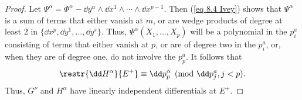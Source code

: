 \begin{proof}
    Let $\Psi^\alpha=\Phi^\alpha-\dd y^\alpha\wedge\dd x^1\wedge\cdots\wedge\dd x^{p-1}$. Then (\ref{eq 8.4 Ivey}) shows that $\Psi^\alpha$ is a sum of terms that either vanish at $m$, or are wedge products of degree at least $2$ in $\{\dd x^p,\dd y^1,\ldots,\dd y^s\}$. Thus, $\Psi^\alpha(X_1,\ldots,X_p)$ will be a polynomial in the $p^a_i$ consisting of terms that either vanish at $p$, or are of degree two in the $p^a_i$, or, when they are of degree one, do not involve the $p^a_p$. It follows that 
    \[\restr{\dd H^\alpha}{E^+}\equiv \dd p^\alpha_p \pmod{\dd p^a_j,j<p}.\]
    Thus, $G^\nu$ and $H^\alpha$ have linearly independent differentials at $E^+$.
\end{proof}






